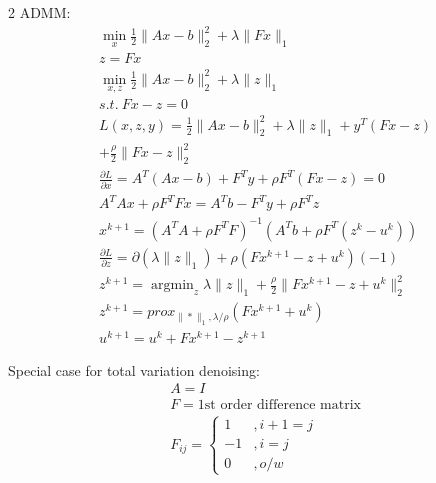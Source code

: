 \documentclass[8pt]{extarticle}
\DeclareMathOperator*{\argmin}{argmin}
\newcommand{\norm}[1]{\|#1\|}
\begin{document}
\begin{multicols*}{2}
  ADMM:
  \begin{align*}
    &\min_x \frac{1}{2}\norm{Ax-b}_2^2 + \lambda \norm{Fx}_1\\
    &z=Fx\\
    &\min_{x,z} \frac{1}{2}\norm{Ax-b}_2^2 + \lambda \norm{z}_1\\
    &s.t.\ Fx-z=0\\
    &L(x,z,y) = \frac{1}{2}\norm{Ax-b}_2^2 + \lambda \norm{z}_1 + y^T(Fx-z)\\
    &+ \frac{\rho}{2}\norm{Fx-z}_2^2\\
    &\frac{\partial L}{\partial x} = A^T(Ax-b) + F^T y + \rho F^T(Fx-z)=0\\
    &A^T Ax + \rho F^TFx = A^T b - F^T y + \rho F^T z\\
    &x^{k+1} = (A^T A + \rho F^T F)^{-1}(A^T b + \rho F^T (z^k-u^k))\\
    &\frac{\partial L}{\partial z} = \partial (\lambda \norm{z}_1) + \rho(Fx^{k+1}-z+u^k)(-1)\\
    &z^{k+1} = \argmin_z \lambda \norm{z}_1 + \frac{\rho}{2} \norm{Fx^{k+1}-z+u^k}_2^2\\
    &z^{k+1} = prox_{\norm{*}_1, \lambda/\rho} (Fx^{k+1}+u^k)\\
    &u^{k+1} = u^k + Fx^{k+1} - z^{k+1}
  \end{align*}
    
  Special case for total variation denoising:
  \begin{align*}
    &A=I\\
    &F=\text{1st order difference matrix}\\
    &F_{ij}=
      \begin{cases}
        1 &, i+1=j\\
        -1&, i=j\\
        0&, o/w
      \end{cases}
  \end{align*}

  \vfill\null
  \columnbreak


\end{multicols*}
\end{document}
